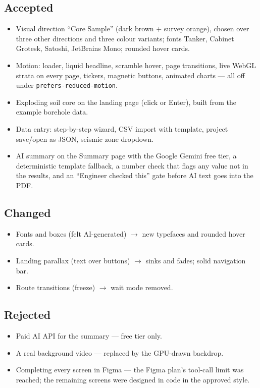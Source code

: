\documentclass[11pt,a4paper]{article}
\newcommand{\code}[1]{\texttt{\small #1}}
\begin{document}
\subsection{Accepted}
\begin{itemize}[leftmargin=12pt]
\item Visual direction ``Core Sample'' (dark brown + survey orange), chosen over three other directions and three
  colour variants; fonts Tanker, Cabinet Grotesk, Satoshi, JetBrains Mono; rounded hover cards.
\item Motion: loader, liquid headline, scramble hover, page transitions, live WebGL strata on every page, tickers,
  magnetic buttons, animated charts --- all off under \code{prefers-reduced-motion}.
\item Exploding soil core on the landing page (click or Enter), built from the example borehole data.
\item Data entry: step-by-step wizard, CSV import with template, project save/open as JSON, seismic zone dropdown.
\item AI summary on the Summary page with the Google Gemini free tier, a deterministic template fallback, a number
  check that flags any value not in the results, and an ``Engineer checked this'' gate before AI text goes into the PDF.
\end{itemize}

\subsection{Changed}
\begin{itemize}[leftmargin=12pt]
\item Fonts and boxes (felt AI-generated) $\rightarrow$ new typefaces and rounded hover cards.
\item Landing parallax (text over buttons) $\rightarrow$ sinks and fades; solid navigation bar.
\item Route transitions (freeze) $\rightarrow$ wait mode removed.
\end{itemize}

\subsection{Rejected}
\begin{itemize}[leftmargin=12pt]
\item Paid AI API for the summary --- free tier only.
\item A real background video --- replaced by the GPU-drawn backdrop.
\item Completing every screen in Figma --- the Figma plan's tool-call limit was reached; the remaining screens were
  designed in code in the approved style.
\end{itemize}
\end{document}
